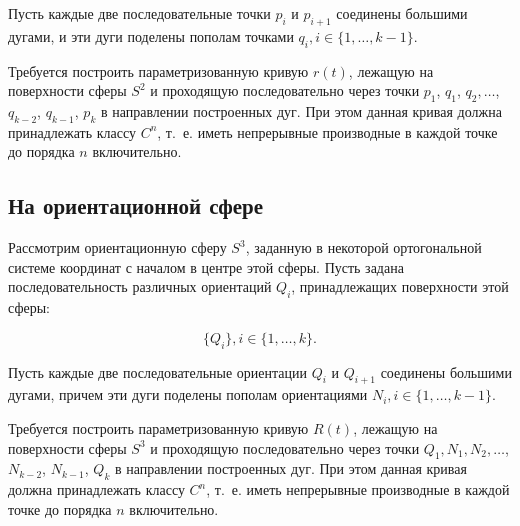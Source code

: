 Пусть каждые две последовательные точки $p_i$ и $p_{i+1}$ соединены большими дугами, и эти дуги поделены пополам
точками $q_i, i \in \{1, \dots, k-1\}$.

Требуется построить параметризованную кривую $r(t)$, лежащую на поверхности сферы $S^2$ и проходящую последовательно
через точки $p_1$, $q_1$, $q_2, \dots$, $q_{k-2}$, $q_{k-1}$, $p_k$ в направлении построенных дуг. При этом данная кривая должна
принадлежать классу $C^n$, т.~е. иметь непрерывные производные в каждой точке до порядка $n$ включительно.

\subsection*{На ориентационной сфере}

Рассмотрим ориентационную сферу $S^3$, заданную в некоторой ортогональной сис\-теме координат с началом в центре этой
сферы. Пусть задана последовательность различных ориентаций $Q_i$, принадлежащих поверхности этой сферы:

$$\{Q_i\}, i \in \{1, \dots, k\}.$$

Пусть каждые две последовательные ориентации $Q_i$ и $Q_{i+1}$ соединены большими дугами, причем эти дуги поделены пополам
ориентациями $N_i, i \in \{1, \dots, k-1\}$.

Требуется построить параметризованную кривую $R(t)$, лежащую на поверхности сферы $S^3$ и проходящую последовательно
через точки $Q_1, N_1, N_2, \dots$, $N_{k-2}$, $N_{k-1}$, $Q_k$ в направлении построенных дуг. При этом данная кривая должна
принадлежать классу $C^n$, т.~е. иметь непрерывные производные в каждой точке до порядка $n$ включительно.
